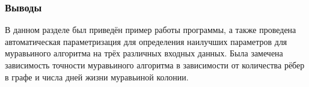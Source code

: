 \subsubsection*{Выводы}

\hspace{1.25cm}
В данном разделе был приведён пример работы программы, а также проведена автоматическая параметризация для определения наилучших параметров для муравьиного алгоритма на трёх различных входных данных. Была замечена зависимость точности муравьиного алгоритма в зависимости от количества рёбер в графе и числа дней жизни муравьиной колонии. 

\newpage